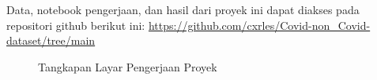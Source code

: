 
Data, notebook pengerjaan, dan hasil dari proyek ini dapat diakses pada repositori github berikut ini:
\href{https://github.com/cxrles/Covid-non_Covid-dataset/tree/main}{\url{https://github.com/cxrles/Covid-non_Covid-dataset/tree/main}}


\begin{figure}[h!]
  \centering
  \caption{Tangkapan Layar Pengerjaan Proyek}
  \label{proyek}
\end{figure}
